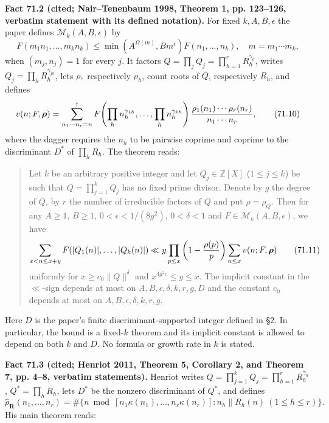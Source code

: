\documentclass[10pt,reqno]{amsart}
\theoremstyle{definition}
\newcommand{\1}{\mathbf 1}
\begin{document}
\medskip\noindent\textbf{Fact 71.2 (cited; Nair--Tenenbaum 1998, Theorem 1, pp. 123--126,
verbatim statement with its defined notation).}  For fixed $k,A,B,\epsilon$
the paper defines $\mathcal M_k(A,B,\epsilon)$ by
\begin{equation}
 F(m_1n_1,\ldots,m_kn_k)
 \leq\min(A^{\Omega(m)},Bm^\epsilon)F(n_1,\ldots,n_k),
 \quad m=m_1\cdots m_k,                                  \tag{71.9}
\end{equation}
when $(m_j,n_j)=1$ for every $j$.  It factors
$Q=\prod_jQ_j=\prod_{h=1}^rR_h^{\gamma_h}$, writes
$Q_j=\prod_hR_h^{\gamma_{jh}}$, lets $\rho,$ respectively
$\rho_h$, count roots of $Q$, respectively $R_h$, and defines
\begin{equation}
 v(n;F,\boldsymbol\rho)=
 \sum_{n_1\cdots n_r=n}^{\dagger}
 F\!\left(\prod_hn_h^{\gamma_{1h}},\ldots,
          \prod_hn_h^{\gamma_{kh}}\right)
 {\rho_1(n_1)\cdots\rho_r(n_r)\over n_1\cdots n_r},      \tag{71.10}
\end{equation}
where the dagger requires the $n_h$ to be pairwise coprime and
coprime to the discriminant $D^*$ of $\prod_hR_h$.  The theorem reads:

\begin{quote}
Let $k$ be an arbitrary positive integer and let
$Q_j\in\mathbb Z[X]$ ($1\leq j\leq k$) be such that
$Q=\prod_{j=1}^kQ_j$ has no fixed prime divisor.  Denote by $g$ the
degree of $Q$, by $r$ the number of irreducible factors of $Q$ and
put $\rho=\rho_Q$.  Then for any $A\geq1$, $B\geq1$,
$0<\epsilon<1/(8g^2)$, $0<\delta<1$ and
$F\in\mathcal M_k(A,B,\epsilon)$, we have
\begin{equation}
\sum_{x<n\leq x+y}F(|Q_1(n)|,\ldots,|Q_k(n)|)
\ll y\prod_{p\leq x}\left(1-{\rho(p)\over p}\right)
\sum_{n\leq x}v(n;F,\boldsymbol\rho)           \tag{71.11}
\end{equation}
uniformly for $x\geq c_0\|Q\|^\delta$ and
$x^{4g^2\epsilon}\leq y\leq x$.  The implicit constant in the
$\ll$-sign depends at most on
$A,B,\epsilon,\delta,k,r,g,D$ and the constant $c_0$ depends at
most on $A,B,\epsilon,\delta,k,r,g$.
\end{quote}

Here $D$ is the paper's finite discriminant-supported integer defined in
\S2.  In particular, the bound is a fixed-$k$ theorem and its implicit
constant is allowed to depend on both $k$ and $D$.  No formula or growth
rate in $k$ is stated.

\medskip\noindent\textbf{Fact 71.3 (cited; Henriot 2011, Theorem 5, Corollary 2, and
Theorem 7, pp. 4--8, verbatim statements).}  Henriot writes
$Q=\prod_{j=1}^kQ_j=\prod_{h=1}^rR_h^{\gamma_h}$,
$Q^*=\prod_hR_h$, lets $D^*$ be the nonzero discriminant of
$Q^*$, and defines
\begin{equation}
 \widehat\rho_{\mathbf R}(n_1,\ldots,n_r)
 =\#\{n\bmod[n_1\kappa(n_1),\ldots,n_r\kappa(n_r)]:
                         n_h\parallel R_h(n)\ (1\leq h\leq r)\}. \tag{71.12}
\end{equation}
His main theorem reads:
\end{document}
